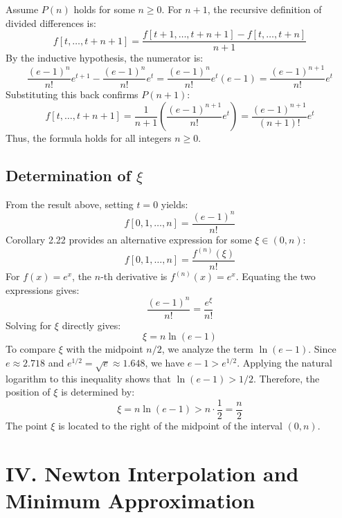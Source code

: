 \documentclass[a4paper]{article}
\begin{document}
Assume $P(n)$ holds for some $n \ge 0$. For $n+1$, the recursive definition of divided differences is:
\[
f[t, \dots, t+n+1] = \frac{f[t+1, \dots, t+n+1] - f[t, \dots, t+n]}{n+1}
\]
By the inductive hypothesis, the numerator is:
\[
\frac{(e-1)^n}{n!}e^{t+1} - \frac{(e-1)^n}{n!}e^t = \frac{(e-1)^n}{n!}e^t(e-1) = \frac{(e-1)^{n+1}}{n!}e^t
\]
Substituting this back confirms $P(n+1)$:
\[
f[t, \dots, t+n+1] = \frac{1}{n+1} \left( \frac{(e-1)^{n+1}}{n!}e^t \right) = \frac{(e-1)^{n+1}}{(n+1)!}e^t
\]
Thus, the formula holds for all integers $n \ge 0$.

\subsection*{Determination of $\xi$}

From the result above, setting $t=0$ yields:
\[
f[0, 1, \dots, n] = \frac{(e-1)^n}{n!}
\]
Corollary 2.22 provides an alternative expression for some $\xi \in (0, n)$:
\[
f[0, 1, \dots, n] = \frac{f^{(n)}(\xi)}{n!}
\]
For $f(x)=e^x$, the $n$-th derivative is $f^{(n)}(x)=e^x$. Equating the two expressions gives:
\[
\frac{(e-1)^n}{n!} = \frac{e^\xi}{n!}
\]
Solving for $\xi$ directly gives:
\[
\xi = n \ln(e-1)
\]
To compare $\xi$ with the midpoint $n/2$, we analyze the term $\ln(e-1)$.
Since $e \approx 2.718$ and $e^{1/2} = \sqrt{e} \approx 1.648$, we have $e-1 > e^{1/2}$.
Applying the natural logarithm to this inequality shows that $\ln(e-1) > 1/2$.
Therefore, the position of $\xi$ is determined by:
\[
\xi = n \ln(e-1) > n \cdot \frac{1}{2} = \frac{n}{2}
\]
The point $\xi$ is located to the right of the midpoint of the interval $(0,n)$.


\section*{IV. Newton Interpolation and Minimum Approximation}
\end{document}
